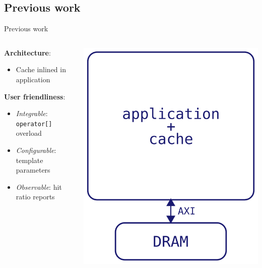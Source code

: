 \documentclass[aspectratio=169]{beamer}
\begin{document}
\subsection{Previous work}
\begin{frame}{Previous work}
	\begin{columns}
		\begin{column}{.5\textwidth}
			\textbf{Architecture}:
			\begin{itemize}
				\item Cache inlined in application
			\end{itemize}

			\bigskip
			\textbf{User friendliness}:
			\begin{itemize}
				\item \emph{Integrable}: \texttt{operator[]} overload
				\item \emph{Configurable}: template parameters
				\item \emph{Observable}: hit ratio reports
			\end{itemize}
		\end{column}
		\begin{column}{.5\textwidth}
			\begin{center}
				\includegraphics[height=.5\textheight]{liang_arch}
			\end{center}
		\end{column}
	\end{columns}
\end{frame}
\end{document}
